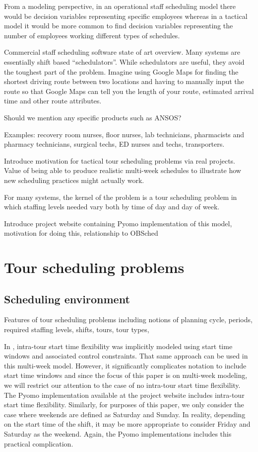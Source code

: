\documentclass{article}
\begin{document}
From a modeling perspective, in an operational staff scheduling model there would be decision variables representing specific employees whereas in a tactical model it would be more common to find decision variables representing the number of employees working different types of schedules.

Commercial staff scheduling software state of art overview. Many systems are essentially shift based ``schedulators''. While schedulators are useful, they avoid the toughest part of the problem. Imagine using Google Maps for finding the shortest driving route between two locations and having to manually input the route so that Google Maps can tell you the length of your route, estimated arrival time and other route attributes.

Should we mention any specific products such as ANSOS?

Examples: recovery room nurses, floor nurses, lab technicians, pharmacists and pharmacy technicians, surgical techs, ED nurses and techs, transporters.

Introduce motivation for tactical tour scheduling problems via real projects. Value of being able to produce realistic multi-week schedules to illustrate how new scheduling practices might actually work.

For many systems, the kernel of the problem is a tour scheduling problem in which staffing levels needed vary both by time of day and day of week. 

Introduce project website containing Pyomo implementation of this model, motivation for doing this, relationship to OBSched

\section{Tour scheduling problems}

\subsection{Scheduling environment}
\label{sec-schedenv}

Features of tour scheduling problems including notions of planning cycle, periods, required staffing levels, shifts, tours, tour types, 

In \cite{isken:2004}, intra-tour start time flexibility was implicitly modeled using start time windows and associated control constraints. That same approach can be used in this multi-week model. However, it significantly complicates notation to include start time windows and since the focus of this paper is on multi-week modeling, we will restrict our attention to the case of no intra-tour start time flexibility. The Pyomo implementation available at the project website includes intra-tour start time flexibility.  Similarly, for purposes of this paper, we only consider the case where weekends are defined as Saturday and Sunday. In reality, depending on the start time of the shift, it may be more appropriate to consider Friday and Saturday as the weekend. Again, the Pyomo implementations includes this practical complication. 
\end{document}
